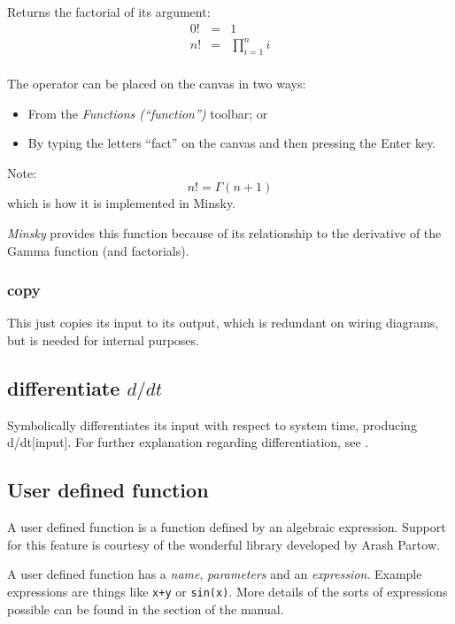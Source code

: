 
\label{Operation:fact} Returns the factorial of its argument: 
\begin{eqnarray*}
0! & = & 1\\
n! & = & \prod_{i=1}^{n}i\\
\end{eqnarray*}

The operator can be placed on the canvas in two ways:
\begin{itemize}
\item From the \emph{Functions (``function'')} toolbar; or 
\item By typing the letters ``fact'' on the canvas and then pressing the
Enter key.
\end{itemize}
Note: 
\[
n!=\Gamma(n+1)
\]
which is how it is implemented in Minsky.

\emph{Minsky} provides this function because of its relationship to
the derivative of the Gamma function (and factorials).

\subsubsection{copy}\label{Operation:copy} This just copies its input to its output,
which is redundant on wiring diagrams, but is needed for internal
purposes.

\subsection{differentiate $d/dt$}\label{Operation:differentiate}
Symbolically differentiates its input with respect to system time,
producing d/dt[input].  For further explanation regarding
differentiation, see
.

\subsection{User defined
  function}\label{Operation:userFunction}\label{UserFunction}

A user defined function is a function defined by an algebraic
expression. Support for this feature is courtesy of the wonderful
library developed by Arash Partow.

A user defined function has a {\em name}, {\em parameters} and an {\em
  expression}. Example expressions are things like \verb'x+y' or
\verb'sin(x)'. More details of the sorts of expressions possible can
be found in the  section of
the manual.

